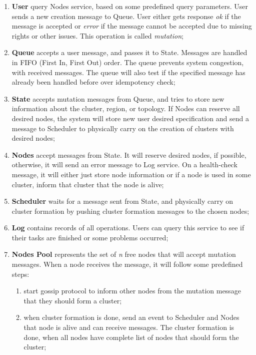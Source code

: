 \begin{enumerate}[start=1,label={(\bfseries \arabic*)}]
	\item \label{cluster_formation_informal_description} \textbf{User} query Nodes service, based on some predefined query parameters. User sends a new creation message to Queue. User either gets response \textit{ok} if the message is accepted or \textit{error} if the message cannot be accepted due to missing rights or other issues. This operation is called \emph{mutation}; 
	\item \textbf{Queue} accepts a user message, and passes it to State. Messages are handled in FIFO (First In, First Out) order. The queue prevents system congestion, with received messages. The queue will also test if the specified message has already been handled before over idempotency check;
	\item \textbf{State} accepts mutation messages from Queue, and tries to store new information about the cluster, region, or topology. If Nodes can reserve all desired nodes, the system  will store new user desired specification and send a message to Scheduler to physically carry on the creation of clusters with desired nodes;
	\item \textbf{Nodes} accept messages from State. It will reserve desired nodes, if possible, otherwise, it will send an error message to Log service. On a health-check message, it will either just store node information or if a node is used in some cluster, inform that cluster that the node is alive;
	\item \textbf{Scheduler} waits for a message sent from State, and physically carry on cluster formation by pushing cluster formation messages to the chosen nodes;
	\item \textbf{Log} contains records of all operations. Users can query this service to see if their tasks are finished or some problems occurred;
	\item \textbf{Nodes Pool} represents the set of \emph{n} free nodes that will accept mutation messages. When a node receives the message, it will follow some predefined steps:
	
	\begin{enumerate}[start=1,label={(\bfseries \roman*)}] 
		\item start gossip protocol to inform other nodes from the mutation message that they should form a cluster;
		\item when cluster formation is done, send an event to Scheduler and Nodes that node is alive and can receive messages. The cluster formation is done, when all nodes have complete list of nodes that should form the cluster;
	\end{enumerate}
\end{enumerate}

